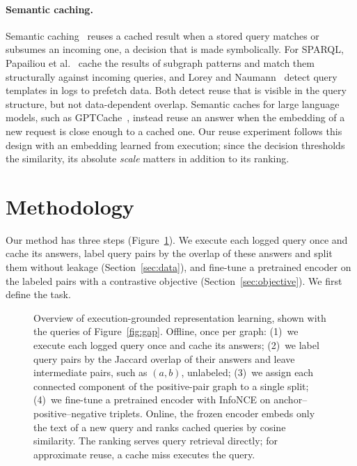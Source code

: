 \documentclass[runningheads]{llncs}
\begin{document}
\paragraph{Semantic caching.}
Semantic caching~\cite{dar1996semanticcaching} reuses a cached result when a
stored query matches or subsumes an incoming one, a decision that is made
symbolically. For SPARQL, Papailiou et al.~\cite{papailiou2015caching} cache
the results of subgraph patterns and match them structurally against incoming
queries, and Lorey and Naumann~\cite{lorey2013templates} detect query
templates in logs to prefetch data. Both detect reuse that is visible in the
query structure, but not data-dependent overlap. Semantic caches for large
language models, such as GPTCache~\cite{bang2023gptcache}, instead reuse an
answer when the embedding of a new request is close enough to a cached one.
Our reuse experiment follows this design with an embedding learned from
execution; since the decision thresholds the similarity, its absolute
\emph{scale} matters in addition to its ranking.

\section{Methodology}
\label{sec:method}

Our method has three steps (Figure~\ref{fig:pipeline}). We execute each
logged query once and cache its answers, label query pairs by the overlap of
these answers and split them without leakage (Section~\ref{sec:data}), and
fine-tune a pretrained encoder on the labeled pairs with a contrastive
objective (Section~\ref{sec:objective}). We first define the task.

\begin{figure}[t]
\centering

\caption{Overview of execution-grounded representation learning, shown
with the queries of Figure~\ref{fig:gap}. Offline, once per graph: (1)~we
execute each logged query once and cache its answers; (2)~we label query
pairs by the Jaccard overlap of their answers and leave intermediate pairs,
such as $(a,b)$, unlabeled; (3)~we assign each connected component of the
positive-pair graph to a single split; (4)~we fine-tune a pretrained encoder
with InfoNCE on anchor--positive--negative triplets. Online, the frozen
encoder embeds only the text of a new query and ranks cached queries by
cosine similarity. The ranking serves query retrieval directly; for
approximate reuse, a cache miss executes the query.}
\label{fig:pipeline}
\end{figure}
\end{document}
